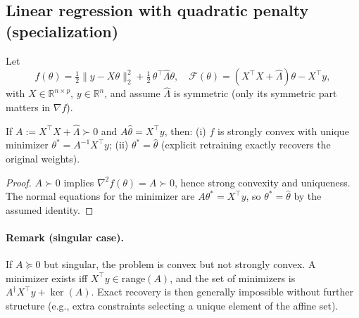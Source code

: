 \documentclass[10pt]{article}
\begin{document}
\subsection*{Linear regression with quadratic penalty (specialization)}
Let
\[
f(\theta)=\tfrac12\|y-X\theta\|_2^2 + \tfrac12\,\theta^\top \hat\Lambda \theta,
\quad
\mathcal{F}(\theta)=(X^\top X+\hat\Lambda)\theta - X^\top y,
\]
with $X\in\mathbb{R}^{n\times p}$, $y\in\mathbb{R}^n$, and assume $\hat\Lambda$ is symmetric
(only its symmetric part matters in $\nabla f$).

\begin{proposition}
\label{prop:lq}
If $A:=X^\top X+\hat\Lambda \succ 0$ and $A\hat\theta=X^\top y$, then:
(i) $f$ is strongly convex with unique minimizer $\theta^*=A^{-1}X^\top y$; 
(ii) $\theta^*=\hat\theta$ (explicit retraining exactly recovers the original weights).
\end{proposition}

\begin{proof}
$A\succ0$ implies $\nabla^2 f(\theta)=A\succ0$, hence strong convexity and uniqueness.
The normal equations for the minimizer are $A\theta^*=X^\top y$, so $\theta^*=\hat\theta$ by the assumed identity.
\end{proof}

\paragraph{Remark (singular case).}
If $A\succeq0$ but singular, the problem is convex but not strongly convex. 
A minimizer exists iff $X^\top y\in \mathrm{range}(A)$, and the set of minimizers is $A^\dagger X^\top y+\ker(A)$.
Exact recovery is then generally impossible without further structure (e.g., extra constraints selecting a unique element of the affine set).
\end{document}
